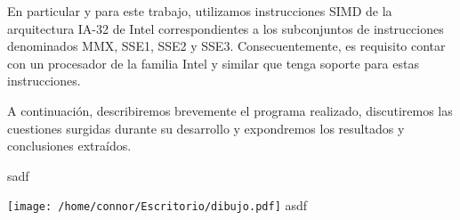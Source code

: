 En particular y para este trabajo, utilizamos instrucciones SIMD de la arquitectura IA-32 de Intel correspondientes a los subconjuntos de instrucciones denominados MMX, SSE1, SSE2 y SSE3. Consecuentemente, es requisito contar con un procesador de la familia Intel y similar que tenga soporte para estas instrucciones. 

A continuación, describiremos brevemente el programa realizado, discutiremos las cuestiones surgidas durante su desarrollo y expondremos los resultados y conclusiones extraídos.

sadf

\texttt{[image: /home/connor/Escritorio/dibujo.pdf]}
asdf

